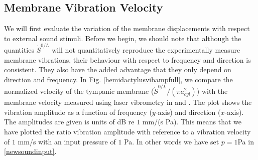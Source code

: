 \subsection{Membrane Vibration Velocity}\label{vibvelocity}
We will first evaluate the variation of the membrane displacements with respect to external 
sound stimuli. Before we begin, we should note that although the quantities
$\dot{S}^{0/L}$ will not quantitatively reproduce the experimentally measure membrane vibrations, their behaviour with respect to
frequency and direction is consistent. They also have the added advantage that they only depend on direction and frequency. In Fig. \ref{hemidactylusvibampfull},
we compare the normalized velocity of the tympanic membrane ($\dot{S}^{0/L}/(\pi a^2_{cyl})$) with the membrane velocity measured using laser vibrometry
in \cite{dalsgaardmanley1} and \cite{dalsgaardmanley2}. The plot shows the vibration amplitude as a function of frequency ($y$-axis) and direction ($x$-axis). The amplitudes are given
is units of dB re $1$ mm/(s Pa). This means that we have plotted the ratio vibration amplitude with reference to a vibration velocity of $1$ mm/s with an input pressure of $1$ Pa.
In other words we have set $p=1$Pa in \eqref{newsoundinput}.

